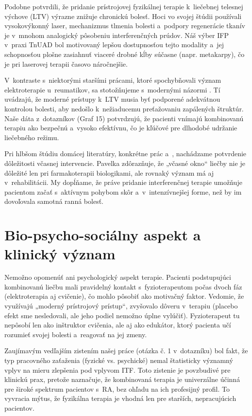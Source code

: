 Podobne \textcite{Alayat2016} potvrdili, že pridanie prístrojovej fyzikálnej terapie k~liečebnej telesnej výchove (LTV) výrazne znižuje chronickú bolesť. Hoci vo svojej štúdii používali vysokovýkonný laser, mechanizmus tlmenia bolesti a~podpory regenerácie tkanív je v~mnohom analogický pôsobeniu interferenčných prúdov. Náš výber IFP v~praxi TnUAD bol motivovaný lepšou dostupnosťou tejto modality a~jej schopnosťou plošne zasiahnuť viaceré drobné kĺby súčasne (napr. metakarpy), čo je pri laserovej terapii časovo náročnejšie.

V~kontraste s~niektorými staršími prácami, ktoré spochybňovali význam elektroterapie u~reumatikov, sa stotožňujeme s~modernými názormi \textcite{metsios2020}. Tí uvádzajú, že moderné prístupy k~LTV musia byť podporené adekvátnou kontrolou bolesti, aby nedošlo k~nežiaducemu preťažovaniu zapálených štruktúr. Naše dáta z~dotazníkov (Graf 15) potvrdzujú, že pacienti vnímajú kombinovanú terapiu ako bezpečnú a~vysoko efektívnu, čo je kľúčové pre dlhodobé udržanie liečebného režimu.

Pri hlbšom štúdiu domácej literatúry, konkrétne prác \textcite{pavelka2012revmatoidni} a~\textcite{pavelka2018}, nachádzame potvrdenie dôležitosti včasnej intervencie. Pavelka zdôrazňuje, že „včasné okno“ liečby nie je dôležité len pri farmakoterapii biologikami, ale rovnaký význam má aj v~rehabilitácii. My dopĺňame, že práve pridanie interferenčnej terapie umožňuje pacientom začať s~aktívnym pohybom skôr a~v~intenzívnejšej forme, než by im dovoľovala samotná ranná bolesť.

\section{Bio-psycho-sociálny aspekt a klinický význam}

Nemožno opomenúť ani psychologický aspekt terapie. Pacienti podstupujúci kombinovanú liečbu mali pravidelný kontakt s~fyzioterapeutom počas dvoch fáz (elektroterapia aj cvičenie), čo mohlo pôsobiť ako motivačný faktor. Vedomie, že využívajú „moderný prístrojový prístup“, zvyšovalo dôveru v~terapiu (placebo efekt sme nesledovali, ale jeho podiel nemožno úplne vylúčiť). Fyzioterapeut tu nepôsobí len ako inštruktor cvičenia, ale aj ako edukátor, ktorý pacienta učí rozumieť svojej bolesti a~reagovať na jej zmeny.

Zaujímavým vedľajším zistením našej práce (otázka č. 1 v~dotazníku) bol fakt, že typ pracovného zaťaženia (fyzické vs. psychické) nemal štatisticky významný vplyv na mieru zlepšenia pod vplyvom ITF. Toto zistenie je povzbudivé pre klinickú prax, pretože naznačuje, že kombinovaná terapia je univerzálne účinná pre široké spektrum pacientov s~RA, bez ohľadu na ich profesijný profil. To vyvracia mýtus, že fyzikálna terapia je vhodná len pre starších, nepracujúcich pacientov.

